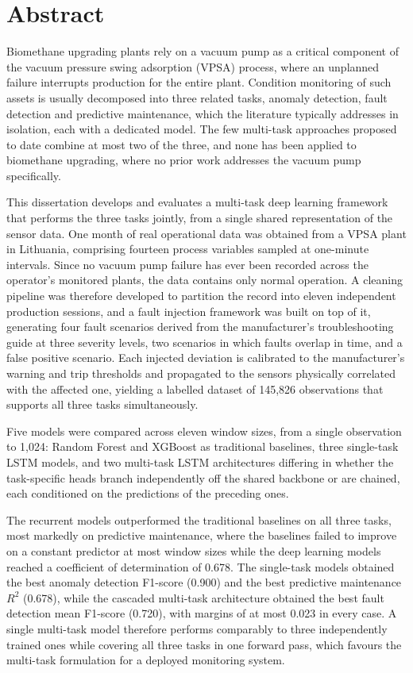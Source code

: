 \chapter*{Abstract}

Biomethane upgrading plants rely on a vacuum pump as a critical component of the vacuum pressure swing
adsorption (VPSA) process, where an unplanned failure interrupts production for the entire plant. Condition
monitoring of such assets is usually decomposed into three related tasks, anomaly detection, fault
detection and predictive maintenance, which the literature typically addresses in isolation, each with a
dedicated model. The few multi-task approaches proposed to date combine at most two of the three, and none
has been applied to biomethane upgrading, where no prior work addresses the vacuum pump specifically.

This dissertation develops and evaluates a multi-task deep learning framework that performs the three tasks
jointly, from a single shared representation of the sensor data. One month of real operational data was
obtained from a VPSA plant in Lithuania, comprising fourteen process variables sampled at one-minute
intervals. Since no vacuum pump failure has ever been recorded across the operator's monitored plants, the
data contains only normal operation. A cleaning pipeline was therefore developed to partition the record
into eleven independent production sessions, and a fault injection framework was built on top of it,
generating four fault scenarios derived from the manufacturer's troubleshooting guide at three severity
levels, two scenarios in which faults overlap in time, and a false positive scenario. Each injected
deviation is calibrated to the manufacturer's warning and trip thresholds and propagated to the sensors
physically correlated with the affected one, yielding a labelled dataset of 145{,}826 observations that
supports all three tasks simultaneously.

Five models were compared across eleven window sizes, from a single observation to 1{,}024: Random Forest
and XGBoost as traditional baselines, three single-task LSTM models, and two multi-task LSTM architectures
differing in whether the task-specific heads branch independently off the shared backbone or are chained,
each conditioned on the predictions of the preceding ones.

The recurrent models outperformed the traditional baselines on all three tasks, most markedly on predictive
maintenance, where the baselines failed to improve on a constant predictor at most window sizes while the
deep learning models reached a coefficient of determination of 0.678. The single-task models obtained the
best anomaly detection F1-score (0.900) and the best predictive maintenance $R^2$ (0.678), while the
cascaded multi-task architecture obtained the best fault detection mean F1-score (0.720), with margins of
at most 0.023 in every case. A single multi-task model therefore performs comparably to three independently
trained ones while covering all three tasks in one forward pass, which favours the multi-task formulation
for a deployed monitoring system.


